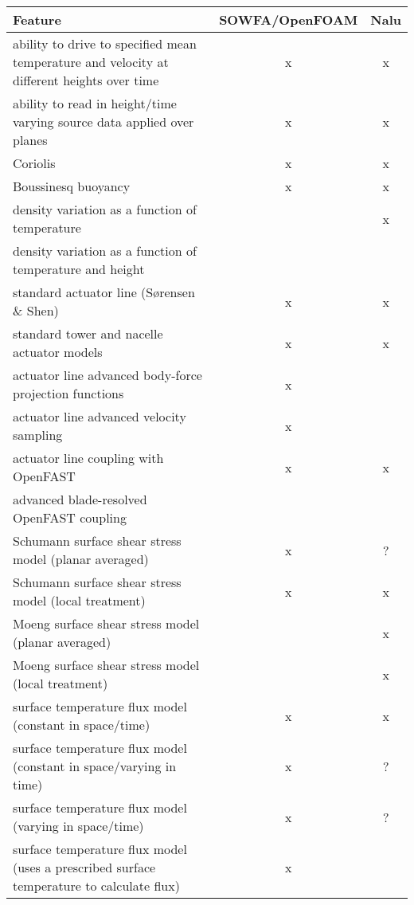 \documentclass{article}
\begin{document}
\begin{center}
\begin{tabular}{ l | c | c }
\toprule
\textbf{Feature} & \textbf{SOWFA/OpenFOAM} & \textbf{Nalu} \\


\midrule
ability to drive to specified mean temperature and velocity at different heights over time & x & x \\
ability to read in height/time varying source data applied over planes & x & x \\
Coriolis & x & x \\
Boussinesq buoyancy & x & x \\
density variation as a function of temperature &   & x \\
density variation as a function of temperature and height &  &  \\


\midrule
standard actuator line (S{\o}rensen \& Shen) & x  & x \\
standard tower and nacelle actuator models & x & x \\
actuator line advanced body-force projection functions & x &  \\
actuator line advanced velocity sampling & x  &  \\
actuator line coupling with OpenFAST & x & x \\
advanced blade-resolved OpenFAST coupling &  &  \\


\midrule
Schumann surface shear stress model (planar averaged)  &  x  &  ?  \\
Schumann surface shear stress model (local treatment)  &  x  &  x  \\
Moeng surface shear stress model (planar averaged) &   & x  \\
Moeng surface shear stress model (local treatment) &   & x  \\
surface temperature flux model (constant in space/time) & x & x \\
surface temperature flux model (constant in space/varying in time) & x & ? \\
surface temperature flux model (varying in space/time) & x & ? \\
surface temperature flux model (uses a prescribed surface temperature to calculate flux) & x &   \\


\bottomrule
\end{tabular}
\end{center}
\end{document}
